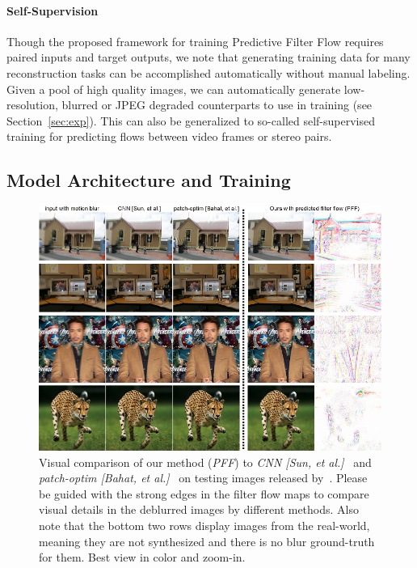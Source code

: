 \documentclass[10pt,twocolumn,letterpaper]{article}
\begin{document}

\paragraph{Self-Supervision}
Though the proposed framework for training Predictive Filter Flow requires
paired inputs and target outputs, we note that generating training data for
many reconstruction tasks can be accomplished automatically without manual
labeling.  Given a pool of high quality images, we can automatically generate
low-resolution, blurred or JPEG degraded counterparts to use in training
(see Section~\ref{sec:exp}).  This can also be generalized to so-called
self-supervised training for predicting flows between video frames or
stereo pairs.



\subsection{Model Architecture and Training}


\begin{figure}[ht]
    \centering
    \begin{minipage}{0.995\textwidth}
        \centering
        \includegraphics[width=1\linewidth]{motion_deblur_v2.png}
        \captionsetup{width=0.999\textwidth}
    \end{minipage}
    \vspace{-3mm}
\caption{Visual comparison of our method (\emph{PFF}) to \emph{CNN [Sun, et al.]}~\cite{sun2015learning} and
    \emph{patch-optim [Bahat, et al.]}~\cite{bahat2017non}
    on testing images released by~\cite{bahat2017non}. Please be guided with the strong edges in the
    filter flow maps to compare visual details in the deblurred images by different methods.
Also note that the bottom two rows display images from the real-world,
meaning they are not synthesized and there is no blur ground-truth for them.
Best view in color and zoom-in.}
\label{fig:demo_motion_deblur}
\vspace{-3mm}
\end{figure}
\end{document}
